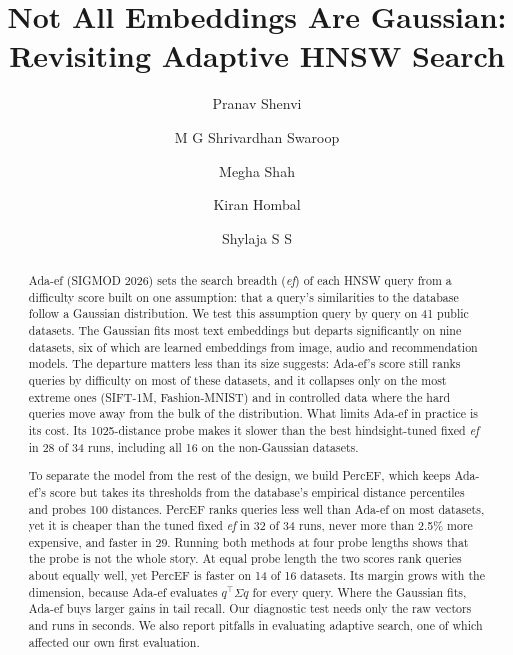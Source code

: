 \documentclass[sigconf,review=false,screen]{acmart}
\newcommand{\ef}{\textit{ef}}
\begin{document}
\title{Not All Embeddings Are Gaussian: Revisiting Adaptive HNSW Search}

\author{Pranav Shenvi}
\author{M G Shrivardhan Swaroop}
\author{Megha Shah}
\author{Kiran Hombal}
\author{Shylaja S S}

\begin{abstract}
Ada-ef (SIGMOD 2026) sets the search breadth (\ef{}) of each HNSW query from a difficulty score
built on one assumption: that a query's similarities to the database follow a Gaussian
distribution. We test this assumption query by query on 41 public datasets. The Gaussian fits most
text embeddings but departs significantly on nine datasets, six of which are learned embeddings from
image, audio and recommendation models. The departure matters less than its size suggests: Ada-ef's
score still ranks queries by difficulty on most of these datasets, and it collapses only on the most
extreme ones (SIFT-1M, Fashion-MNIST) and in controlled data where the hard queries move away from
the bulk of the distribution. What limits Ada-ef in practice is its cost. Its 1025-distance probe
makes it slower than the best hindsight-tuned fixed \ef{} in 28 of 34 runs, including all 16 on the
non-Gaussian datasets.

To separate the model from the rest of the design, we build PercEF, which keeps Ada-ef's score but
takes its thresholds from the database's empirical distance percentiles and probes 100 distances.
PercEF ranks queries less well than Ada-ef on most datasets, yet it is cheaper than the tuned fixed
\ef{} in 32 of 34 runs, never more than 2.5\% more expensive, and faster in 29. Running both methods
at four probe lengths shows that the probe is not the whole story. At equal probe length the two
scores rank queries about equally well, yet PercEF is faster on 14 of 16 datasets. Its margin grows
with the dimension, because Ada-ef evaluates $q^\top\Sigma q$ for every query. Where the Gaussian fits,
Ada-ef buys larger gains in tail recall. Our diagnostic test needs only the raw vectors and runs in
seconds. We also report pitfalls in evaluating adaptive search, one of which affected our own first
evaluation.
\end{abstract}
\end{document}
